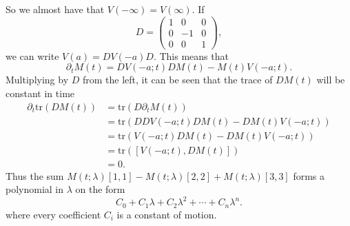 \documentclass[english,master]{liumaiex}
\theoremstyle{plain}
\theoremstyle{definition}
\newcommand{\tr}{\text{tr}}
\begin{document}
So we almost have that $V(-\infty) = V(\infty)$. If
\begin{equation}
	D = 
\begin{pmatrix}
	1 & 0 & 0 \\
	0 & -1 & 0 \\
	0 & 0 & 1
\end{pmatrix},
\end{equation}
%
we can write $V(a) = DV(-a)D$. This means that 
\begin{equation}
	\partial_t M(t) = DV(-a;t)DM(t) - M(t)V(-a;t).
\end{equation}
Multiplying by $D$ from the left, it can be seen that the trace of $DM(t)$ will be constant in time
\begin{equation}
\begin{aligned}
	\partial_t \tr(D M(t))
	&= \tr(D \partial_t M(t)) \\
	&= \tr(DDV(-a;t)DM(t) - DM(t)V(-a;t)) \\
	&= \tr(V(-a;t)DM(t) - DM(t)V(-a;t)) \\
	&= \tr([V(-a;t), DM(t)]) \\
	&= 0.
\end{aligned}
\end{equation}
Thus the sum $M(t;\lambda)[1,1] - M(t;\lambda)[2,2] + M(t;\lambda)[3,3]$ forms a polynomial in $\lambda$ on the form
\begin{equation}
	C_0 + C_1 \lambda + C_2 \lambda^2 + \cdots + C_{n} \lambda^{n}.
\end{equation}
where every coefficient $C_i$ is a constant of motion.
\end{document}
